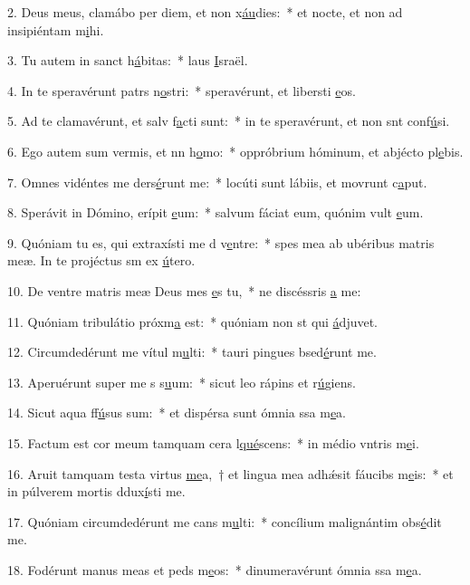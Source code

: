 2. Deus meus, clamábo per diem, et non x\uline{áu}dies:~* et nocte, et non ad insipiéntam m\uline{i}hi.\par 
3. Tu autem in sanct h\uline{á}bitas:~* laus \uline{I}sraël.\par 
4. In te speravérunt patrs n\uline{o}stri:~* speravérunt, et libersti \uline{e}os.\par 
5. Ad te clamavérunt, et salv f\uline{a}cti sunt:~* in te speravérunt, et non snt conf\uline{ú}si.\par 
6. Ego autem sum vermis, et nn h\uline{o}mo:~* oppróbrium hóminum, et abjécto pl\uline{e}bis.\par 
7. Omnes vidéntes me ders\uline{é}runt me:~* locúti sunt lábiis, et movrunt c\uline{a}put.\par 
8. Sperávit in Dómino, erípit \uline{e}um:~* salvum fáciat eum, quónim vult \uline{e}um.\par 
9. Quóniam tu es, qui extraxísti me d v\uline{e}ntre:~* spes mea ab ubéribus matris meæ. In te projéctus sm ex \uline{ú}tero.\par 
10. De ventre matris meæ Deus mes \uline{e}s tu,~* ne discéssris \uline{a} me:\par 
11. Quóniam tribulátio próxm\uline{a} est:~* quóniam non st qui \uline{á}djuvet.\par 
12. Circumdedérunt me vítul m\uline{u}lti:~* tauri pingues bsed\uline{é}runt me.\par 
13. Aperuérunt super me s s\uline{u}um:~* sicut leo rápins et r\uline{ú}giens.\par 
14. Sicut aqua ff\uline{ú}sus sum:~* et dispérsa sunt ómnia ssa m\uline{e}a.\par 
15. Factum est cor meum tamquam cera l\uline{qué}scens:~* in médio vntris m\uline{e}i.\par 
16. Aruit tamquam testa virtus \uline{me}a,~† et lingua mea adhǽsit fáucibs m\uline{e}is:~* et in púlverem mortis ddux\uline{í}sti me.\par 
17. Quóniam circumdedérunt me cans m\uline{u}lti:~* concílium malignántim obs\uline{é}dit me.\par 
18. Fodérunt manus meas et peds m\uline{e}os:~* dinumeravérunt ómnia ssa m\uline{e}a.\par 
